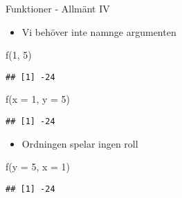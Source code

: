 \documentclass[
  11pt,
  ignorenonframetext,
]{beamer}
\newenvironment{Shaded}{\begin{snugshade}}{\end{snugshade}}
\newcommand{\AttributeTok}[1]{\textcolor[rgb]{0.77,0.63,0.00}{#1}}
\newcommand{\DecValTok}[1]{\textcolor[rgb]{0.00,0.00,0.81}{#1}}
\newcommand{\FunctionTok}[1]{\textcolor[rgb]{0.00,0.00,0.00}{#1}}
\newcommand{\NormalTok}[1]{#1}
\providecommand{\tightlist}{%
  \setlength{\itemsep}{0pt}\setlength{\parskip}{0pt}}
\begin{document}
\begin{frame}[fragile]{Funktioner - Allmänt IV}
\protect\hypertarget{funktioner---allmuxe4nt-iv}{}
\begin{itemize}
\tightlist
\item
  Vi behöver inte namnge argumenten
\end{itemize}

\begin{Shaded}
\begin{Highlighting}[]
\FunctionTok{f}\NormalTok{(}\DecValTok{1}\NormalTok{, }\DecValTok{5}\NormalTok{)}
\end{Highlighting}
\end{Shaded}

\begin{verbatim}
## [1] -24
\end{verbatim}

\begin{Shaded}
\begin{Highlighting}[]
\FunctionTok{f}\NormalTok{(}\AttributeTok{x =} \DecValTok{1}\NormalTok{, }\AttributeTok{y =} \DecValTok{5}\NormalTok{)}
\end{Highlighting}
\end{Shaded}

\begin{verbatim}
## [1] -24
\end{verbatim}

\begin{itemize}
\tightlist
\item
  Ordningen spelar ingen roll
\end{itemize}

\begin{Shaded}
\begin{Highlighting}[]
\FunctionTok{f}\NormalTok{(}\AttributeTok{y =} \DecValTok{5}\NormalTok{, }\AttributeTok{x =} \DecValTok{1}\NormalTok{)}
\end{Highlighting}
\end{Shaded}

\begin{verbatim}
## [1] -24
\end{verbatim}
\end{frame}
\end{document}
